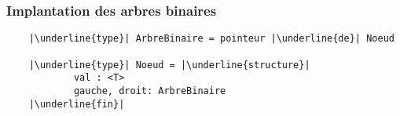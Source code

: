 \documentclass[table,handout,tikz,12pt,svgnames]{beamer}
\begin{document}
\begin{frame}[fragile=singleslide]
	\frametitle{Implantation des arbres binaires}
	\begin{verbatim}
	|\underline{type}| ArbreBinaire = pointeur |\underline{de}| Noeud

	|\underline{type}| Noeud = |\underline{structure}|
			val : <T>
			gauche, droit: ArbreBinaire
	|\underline{fin}|
	\end{verbatim}
%			
\end{frame}
\end{document}
